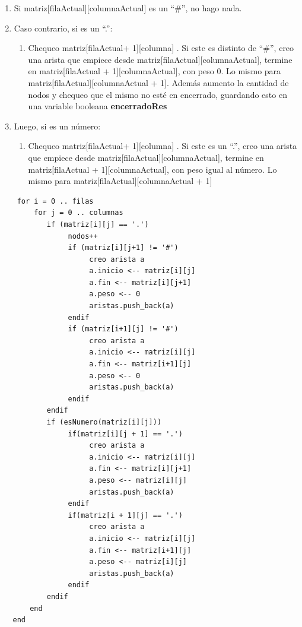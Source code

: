 	\begin{enumerate}
		\item{
			Si matriz[filaActual][columnaActual] es un “\#”, no hago nada.
		}
		\item{
			Caso contrario, si es un “.”:
		}
		\begin{enumerate}
				\item{
					Chequeo matriz[filaActual+ 1][columna] . Si este es distinto de “\#”, creo una arista que empiece desde matriz[filaActual][columnaActual], termine en matriz[filaActual + 1][columnaActual], con peso 0. Lo mismo para matriz[filaActual][columnaActual + 1]. Además aumento la cantidad de nodos y chequeo que el mismo no esté en encerrado, guardando esto en una variable booleana \textbf{encerradoRes}
				}
		\end{enumerate}
		\item{
			Luego, si es un número:
		}
		\begin{enumerate}
				\item{
					Chequeo matriz[filaActual+ 1][columna] . Si este es un “.”, creo una arista que empiece desde matriz[filaActual][columnaActual], termine en matriz[filaActual + 1][columnaActual], con peso igual al número. Lo mismo para matriz[filaActual][columnaActual + 1]
						}
		\end{enumerate}
	\end{enumerate}
    

    \begin{codesnippet}
    \begin{verbatim}
    for i = 0 .. filas
        for j = 0 .. columnas
           if (matriz[i][j] == '.')
                nodos++
                if (matriz[i][j+1] != '#')
                     creo arista a
                     a.inicio <-- matriz[i][j]
                     a.fin <-- matriz[i][j+1]
                     a.peso <-- 0
                     aristas.push_back(a)
                endif
                if (matriz[i+1][j] != '#')
                     creo arista a
                     a.inicio <-- matriz[i][j]
                     a.fin <-- matriz[i+1][j]
                     a.peso <-- 0
                     aristas.push_back(a)
                endif
           endif
           if (esNumero(matriz[i][j]))
                if(matriz[i][j + 1] == '.')
                     creo arista a
                     a.inicio <-- matriz[i][j]
                     a.fin <-- matriz[i][j+1]
                     a.peso <-- matriz[i][j]
                     aristas.push_back(a)
                endif
                if(matriz[i + 1][j] == '.')
                     creo arista a
                     a.inicio <-- matriz[i][j]
                     a.fin <-- matriz[i+1][j]
                     a.peso <-- matriz[i][j]
                     aristas.push_back(a)
                endif
           endif
       end
   end
   \end{verbatim}
   \end{codesnippet}

